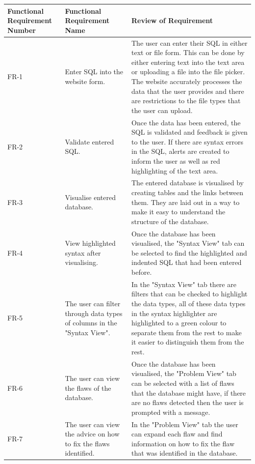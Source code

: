 \begin{center}
	\setlength\extrarowheight{2pt}
	\begin{tabularx}{\textwidth}{|s|s|X|}
		\hline
		\textbf{Functional Requirement Number} & \textbf{Functional Requirement Name} & \textbf{Review of Requirement} \\
		\hline
		FR-1 &  Enter SQL into the website form. & The user can enter their SQL in either text or file form. This can be done by either entering text into the text area or uploading a file into the file picker. The website accurately processes the data that the user provides and there are restrictions to the file types that the user can upload. \\
		\hline
		FR-2 & Validate entered SQL. & Once the data has been entered, the SQL is validated and feedback is given to the user. If there are syntax errors in the SQL, alerts are created to inform the user as well as red highlighting of the text area.\\
		\hline
		FR-3 & Visualise entered database. & The entered database is visualised by creating tables and the links between them. They are laid out in a way to make it easy to understand the structure of the database.\\
		\hline
		FR-4 & View highlighted syntax after visualising. & Once the database has been visualised, the "Syntax View" tab can be selected to find the highlighted and indented SQL that had been entered before. \\
		\hline
		FR-5 & The user can filter through data types of columns in the "Syntax View". & In the "Syntax View" tab there are filters that can be checked to highlight the data types, all of these data types in the syntax highlighter are highlighted to a green colour to separate them from the rest to make it easier to distinguish them from the rest. \\
		\hline
		FR-6 & The user can view the flaws of the database. & Once the database has been visualised, the "Problem View" tab can be selected with a list of flaws that the database might have, if there are no flaws detected then the user is prompted with a message. \\
		\hline
		FR-7 & The user can view the advice on how to fix the flaws identified. & In the "Problem View" tab the user can expand each flaw and find information on how to fix the flaw that was identified in the database. \\
		\hline
	\end{tabularx}
\end{center}